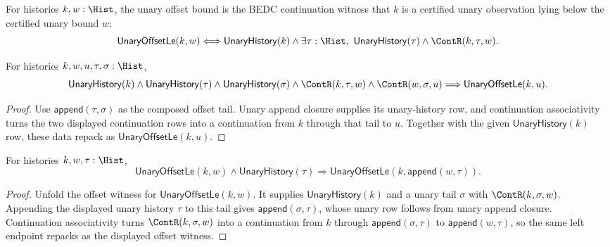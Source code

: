 \begin{definition}
\label{def:real-unary-offset-bound}
For histories $k,w:\Hist$, the unary offset bound is the BEDC continuation
witness that $k$ is a certified unary observation lying below the certified
unary bound $w$:
$$
\mathsf{UnaryOffsetLe}(k,w)
\Longleftrightarrow
\mathsf{UnaryHistory}(k)\land
\exists \tau:\Hist,\ \mathsf{UnaryHistory}(\tau)\land \ContR(k,\tau,w).
$$
\end{definition}

\begin{theorem}
\label{thm:real-unary-offset-cont-trans}
For histories $k,w,u,\tau,\sigma:\Hist$,
$$
\mathsf{UnaryHistory}(k)\land\mathsf{UnaryHistory}(\tau)\land
\mathsf{UnaryHistory}(\sigma)\land
\ContR(k,\tau,w)\land\ContR(w,\sigma,u)
\Longrightarrow
\mathsf{UnaryOffsetLe}(k,u).
$$
\end{theorem}
\begin{proof}
Use $\mathsf{append}(\tau,\sigma)$ as the composed offset tail. Unary append
closure supplies its unary-history row, and continuation associativity turns
the two displayed continuation rows into a continuation from $k$ through that
tail to $u$. Together with the given $\mathsf{UnaryHistory}(k)$ row, these
data repack as $\mathsf{UnaryOffsetLe}(k,u)$.
\end{proof}

\begin{theorem}
\label{thm:unary-offset-le-append-tail-closed}
For histories $k,w,\tau:\Hist$,
$$
\mathsf{UnaryOffsetLe}(k,w)\land \mathsf{UnaryHistory}(\tau)
\Longrightarrow
\mathsf{UnaryOffsetLe}(k,\mathsf{append}(w,\tau)).
$$
\end{theorem}
\begin{proof}
Unfold the offset witness for $\mathsf{UnaryOffsetLe}(k,w)$. It supplies
$\mathsf{UnaryHistory}(k)$ and a unary tail $\sigma$ with
$\ContR(k,\sigma,w)$. Appending the displayed unary history $\tau$ to this
tail gives $\mathsf{append}(\sigma,\tau)$, whose unary row follows from unary
append closure. Continuation associativity turns
$\ContR(k,\sigma,w)$ into a continuation from $k$ through
$\mathsf{append}(\sigma,\tau)$ to $\mathsf{append}(w,\tau)$, so the same
left endpoint repacks as the displayed offset witness.
\end{proof}


